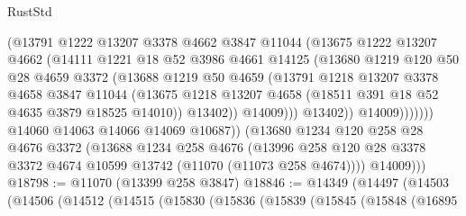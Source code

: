 \begin{lexlean}{RustStd}
\begin{coremodule}
                            (@13791
                              @1222
                              @13207
                              @3378
                              @4662
                              @3847
                              @11044
                              (@13675
                                @1222
                                @13207
                                @4662
                                (@14111
                                  @1221
                                  @18
                                  @52
                                  @3986
                                  @4661
                                  @14125
                                  (@13680
                                    @1219
                                    @120
                                    @50
                                    @28
                                    @4659
                                    @3372
                                    (@13688
                                      @1219
                                      @50
                                      @4659
                                      (@13791
                                        @1218
                                        @13207
                                        @3378
                                        @4658
                                        @3847
                                        @11044
                                        (@13675
                                          @1218
                                          @13207
                                          @4658
                                          (@18511 @391 @18 @52 @4635 @3879 @18525 @14010))
                                        @13402))
                                    @14009)))
                              @13402))
                          @14009)))))))
            @14060
            @14063
            @14066
            @14069
            @10687))
        (@13680
          @1234
          @120
          @258
          @28
          @4676
          @3372
          (@13688
            @1234
            @258
            @4676
            (@13996 @258 @120 @28 @3378 @3372 @4674 @10599 @13742 (@11070 (@11073 @258 @4674))))
          @14009)))
@18798 := @11070 (@13399 @258 @3847)
@18846 := @14349
    (@14497
      (@14503
        (@14506
          (@14512
            (@14515
              (@15830
                (@15836
                  (@15839
                    (@15845
                      (@15848
                        (@16895

\end{coremodule}
\end{lexlean}
